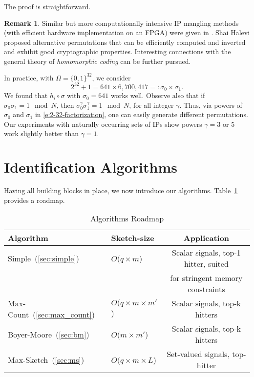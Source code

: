 \documentclass[10pt, conference, letterpaper,onecolumn]{IEEEtranv1.8}
\theoremstyle{plain}\newtheorem{thm}{Theorem}\newtheorem{lem}{Lemma}
\theoremstyle{definition}
\newtheorem{rem}{Remark}
\begin{document}
\noindent 
The proof is straightforward. 

\begin{rem}Similar but more computationally intensive IP mangling methods (with efficient hardware 
implementation on an FPGA) were given in \cite{4146856}. Shai Halevi \cite{halevi:2007} proposed 
alternative permutations that can be efficiently computed and inverted and exhibit good cryptographic
properties. Interesting connections with the general theory of {\em homomorphic coding} can be further pursued. 
\end{rem}



In practice, with $\Omega=\{0,1\}^{32}$, we consider 
\begin{equation}
\label{e:2-32-factorization}
   2^{32} +1 = 641 \times 6,700,417 =: \sigma_0 \times \sigma_1.
\end{equation}
We found that $h_i \circ \sigma$ with $\sigma_0 = 641$ works well. Observe also that if $\sigma_0 \sigma_1 = 1 \mod N$, then $\sigma_0^\gamma \sigma_1^\gamma = 1 \mod N$, 
for all integer $\gamma$. Thus, via powers of $\sigma_0$ and $\sigma_1$ in \eqref{e:2-32-factorization}, one can easily generate different permutations. 
Our experiments with naturally occurring sets of IPs show powers $\gamma=3$ or $5$ work slightly better than $\gamma=1$.




\section{Identification Algorithms}
\label{sec:identification}

Having all  building blocks in place, we now introduce our algorithms. Table~\ref{tab:roadmap} provides a roadmap.


\begin{table}[t]
\caption{Algorithms Roadmap}
\scriptsize
\centering
\label{tab:roadmap}
\begin{tabular}{|l|l|c|}
\hline
{\bf Algorithm}                & {\bf Sketch-size}             & {\bf Application}  \\   
\hline\hline                                                              
Simple~(\ref{sec:simple})                   & $O(q\times m$)          & Scalar signals, top-1 hitter, suited  \\
                    &           &                            for stringent memory constraints  \\
\hline                    
Max-Count~(\ref{sec:max_count})                & $O(q\times m \times m'$) & Scalar signals, top-k hitters                                                \\
\hline
Boyer-Moore~(\ref{sec:bm}) & $O(m\times m'$)          & Scalar signals, top-k hitters                                                \\
\hline
Max-Sketch~(\ref{sec:ms})               & $O(q\times m \times L$) & Set-valued signals, top-hitter         \\
\hline                                     
\end{tabular}
\end{table}
\end{document}
